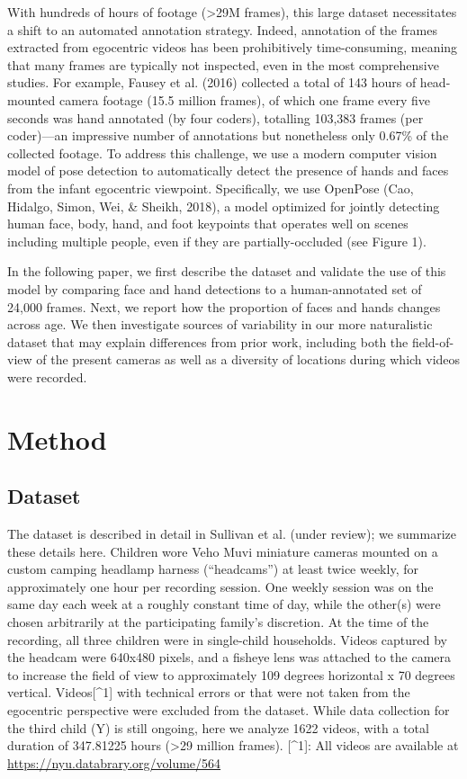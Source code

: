 \documentclass[10pt, letterpaper]{article}
\begin{document}
With hundreds of hours of footage (\textgreater{}29M frames), this large
dataset necessitates a shift to an automated annotation strategy.
Indeed, annotation of the frames extracted from egocentric videos has
been prohibitively time-consuming, meaning that many frames are
typically not inspected, even in the most comprehensive studies. For
example, Fausey et al. (2016) collected a total of 143 hours of
head-mounted camera footage (15.5 million frames), of which one frame
every five seconds was hand annotated (by four coders), totalling
103,383 frames (per coder)---an impressive number of annotations but
nonetheless only 0.67\% of the collected footage. To address this
challenge, we use a modern computer vision model of pose detection to
automatically detect the presence of hands and faces from the infant
egocentric viewpoint. Specifically, we use OpenPose (Cao, Hidalgo,
Simon, Wei, \& Sheikh, 2018), a model optimized for jointly detecting
human face, body, hand, and foot keypoints that operates well on scenes
including multiple people, even if they are partially-occluded (see
Figure 1).

In the following paper, we first describe the dataset and validate the
use of this model by comparing face and hand detections to a
human-annotated set of 24,000 frames. Next, we report how the proportion
of faces and hands changes across age. We then investigate sources of
variability in our more naturalistic dataset that may explain
differences from prior work, including both the field-of-view of the
present cameras as well as a diversity of locations during which videos
were recorded.

\section{Method}\label{method}

\subsection{Dataset}\label{dataset}

The dataset is described in detail in Sullivan et al. (under review); we
summarize these details here. Children wore Veho Muvi miniature cameras
mounted on a custom camping headlamp harness (``headcams'') at least
twice weekly, for approximately one hour per recording session. One
weekly session was on the same day each week at a roughly constant time
of day, while the other(s) were chosen arbitrarily at the participating
family's discretion. At the time of the recording, all three children
were in single-child households. Videos captured by the headcam were
640x480 pixels, and a fisheye lens was attached to the camera to
increase the field of view to approximately 109 degrees horizontal x 70
degrees vertical. Videos{[}\^{}1{]} with technical errors or that were
not taken from the egocentric perspective were excluded from the
dataset. While data collection for the third child (Y) is still ongoing,
here we analyze 1622 videos, with a total duration of 347.81225 hours
(\textgreater{}29 million frames). {[}\^{}1{]}: All videos are available
at \url{https://nyu.databrary.org/volume/564}
\end{document}
